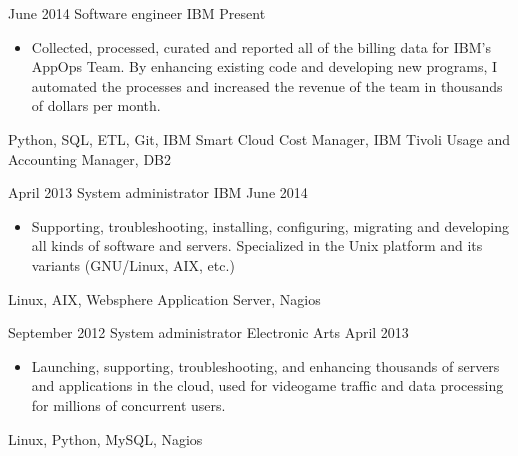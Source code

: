 %
%
%


\begin{experiences}
    \experience
        {June 2014}
        {Software engineer}
        {IBM}
        {Present}
        {
            \begin{itemize}
                \item Collected, processed, curated and reported all of the 
                    billing data for IBM's AppOps Team. By enhancing existing 
                    code and developing new programs, I automated the processes 
                    and increased the revenue of the team in thousands of 
                    dollars per month.
            \end{itemize}
        }
        {
            Python,
            SQL,
            ETL,
            Git,
            IBM Smart Cloud Cost Manager,
            IBM Tivoli Usage and Accounting Manager,
            DB2
        }

    \emptySeparator

    \experience
        {April 2013}
        {System administrator}
        {IBM}
        {June 2014}
        {
            \begin{itemize}
                \item Supporting, troubleshooting, installing, configuring, 
                    migrating and developing all kinds of software and servers. 
                    Specialized in the Unix platform and its variants 
                    (GNU/Linux, AIX, etc.)
            \end{itemize}
        }
        {
            Linux,
            AIX,
            Websphere Application Server,
            Nagios
        }

    \emptySeparator

    \experience
        {September 2012}
        {System administrator}
        {Electronic Arts}
        {April 2013}
        {
            \begin{itemize}
                \item Launching, supporting, troubleshooting, and enhancing
                    thousands of servers and applications in the cloud, used 
                    for videogame traffic and data processing for millions of 
                    concurrent users.
            \end{itemize}
        }
        {
            Linux,
            Python,
            MySQL,
            Nagios
        }


\end{experiences}
